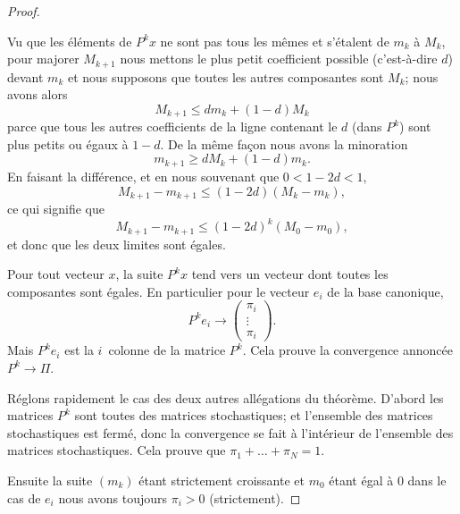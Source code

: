 \begin{proof}
\begin{subproof}
		Vu que les éléments de \( P^kx\) ne sont pas tous les mêmes et s'étalent de \( m_k\) à \( M_k\), pour majorer \( M_{k+1}\) nous mettons le plus petit coefficient possible (c'est-à-dire \( d\)) devant \( m_k\) et nous supposons que toutes les autres composantes sont \( M_k\); nous avons alors
		\begin{equation}
			M_{k+1}\leq dm_k+(1-d)M_k
		\end{equation}
		parce que tous les autres coefficients de la ligne contenant le \( d\) (dans \( P^k\)) sont plus petits ou égaux à \( 1-d\). De la même façon nous avons la minoration
		\begin{equation}
			m_{k+1}\geq dM_k+(1-d)m_k.
		\end{equation}
		En faisant la différence, et en nous souvenant que \( 0<1-2d<1\),
		\begin{equation}
			M_{k+1}-m_{k+1}\leq (1-2d)(M_k-m_k),
		\end{equation}
		ce qui signifie que
		\begin{equation}
			M_{k+1}-m_{k+1}\leq (1-2d)^k(M_0-m_0),
		\end{equation}
		et donc que les deux limites sont égales.


		Pour tout vecteur \( x\), la suite \( P^kx\) tend vers un vecteur dont toutes les composantes sont égales. En particulier pour le vecteur \( e_i\) de la base canonique,
		\begin{equation}
			P^ke_i\to\begin{pmatrix}
				\pi_i  \\
				\vdots \\
				\pi_i
			\end{pmatrix}.
		\end{equation}
		Mais \( P^ke_i\) est la \( i\)\ieme\ colonne de la matrice \( P^k\). Cela prouve la convergence annoncée \( P^k\to \Pi\).
	\end{subproof}

	Réglons rapidement le cas des deux autres allégations du théorème. D'abord les matrices \( P^k\) sont toutes des matrices stochastiques; et l'ensemble des matrices stochastiques est fermé, donc la convergence se fait à l'intérieur de l'ensemble des matrices stochastiques. Cela prouve que \( \pi_1+\ldots +\pi_N=1\).

	Ensuite la suite \( (m_k)\) étant strictement croissante et \( m_0\) étant égal à \( 0\) dans le cas de \( e_i\) nous avons toujours \( \pi_i>0\) (strictement).
\end{proof}


